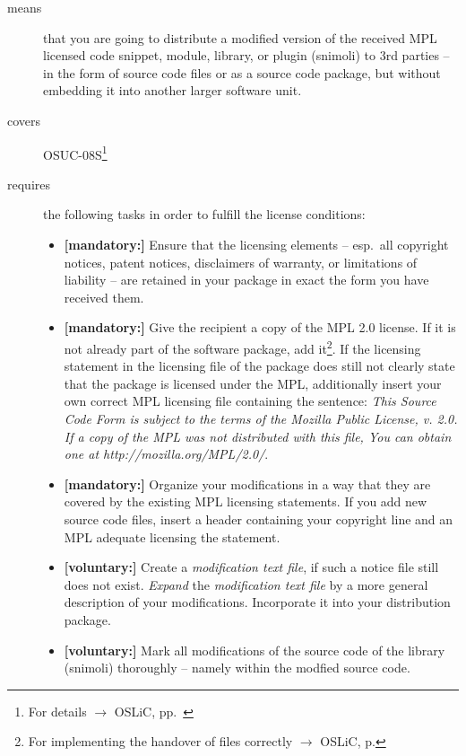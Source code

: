 \begin{description}
\item[means] that you are going to distribute a modified version of the received
MPL licensed code snippet, module, library, or plugin (snimoli) to 3rd parties
-- in the form of source code files or as a source code package, but without
embedding it into another larger software unit.
\item[covers] OSUC-08S\footnote{For details $\rightarrow$ OSLiC, pp.\
\pageref{OSUC-08S-DEF}}
\item[requires] the following tasks in order to fulfill the license conditions:
\begin{itemize}

  \item \textbf{[mandatory:]} Ensure that the licensing elements -- esp.\ all
  copyright notices, patent notices, disclaimers of warranty, or limitations of
  liability -- are retained in your package in exact the form you have received
  them.
  
  \item \textbf{[mandatory:]} Give the recipient a copy of the MPL 2.0 license.
  If it is not already part of the software package, add it\footnote{For
  implementing the handover of files correctly $\rightarrow$ OSLiC, p.
  \pageref{DistributingFilesHint}}. If the licensing statement in the licensing
  file of the package does still not clearly state that the package is licensed
  under the MPL, additionally insert your own correct MPL licensing file
  containing the sentence: \emph{This Source Code Form is subject to the terms
  of the Mozilla Public License, v. 2.0. If a copy of the MPL was not
  distributed with this file, You can obtain one at
  http://mozilla.org/MPL/2.0/}.
  
  \item \textbf{[mandatory:]} Organize your modifications in a way that they are
  covered by the existing MPL licensing statements. If you add new source code
  files, insert a header containing your copyright line and an MPL adequate
  licensing the statement.
  
  \item \textbf{[voluntary:]} Create a \emph{modification text file}, if such a
  notice file still does not exist. \emph{Expand} the \emph{modification text
  file} by a more general description of your modifications. Incorporate it into
  your distribution package.

  \item \textbf{[voluntary:]} Mark all modifications of the source code of the
  library (snimoli) thoroughly -- namely within
  the modfied source code.
  

\end{itemize}
\end{description}
